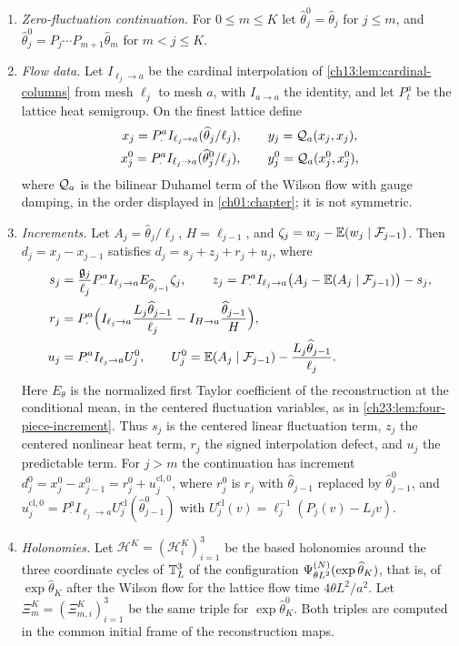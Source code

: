 \begin{definition}
\begin{enumerate}
\item \emph{Zero-fluctuation continuation.} For $0\le m\le K$ let $\widehat\theta_j^0=\widehat\theta_j$ for $j\le m$, and $\widehat\theta_j^0=P_j\cdots P_{m+1}\widehat\theta_m$ for $m<j\le K$.
\item \emph{Flow data.} Let $I_{\ell_j\to a}$ be the cardinal interpolation of \cref{ch13:lem:cardinal-columns} from mesh $\ell_j$ to mesh $a$, with $I_{a\to a}$ the identity, and let $P_t^a$ be the lattice heat semigroup. On the finest lattice define
\[
 \begin{gathered}
 x_j=P_\cdot^aI_{\ell_j\to a}(\widehat\theta_j/\ell_j),\qquad y_j=\mathcal Q_{a}(x_j,x_j),\\
 x_j^0=P_\cdot^aI_{\ell_j\to a}(\widehat\theta_j^0/\ell_j),\qquad y_j^0=\mathcal Q_{a}(x_j^0,x_j^0),
 \end{gathered}
\]
where $\mathcal Q_{a}$ is the bilinear Duhamel term of the Wilson flow with gauge damping, in the order displayed in \cref{ch01:chapter}; it is not symmetric.
\item \emph{Increments.} Let $A_j=\widehat\theta_j/\ell_j$, $H=\ell_{j-1}$, and $\zeta_j=w_j-\mathbb E(w_j\mid\mathcal F_{j-1})$. Then $d_j=x_j-x_{j-1}$ satisfies $d_j=s_j+z_j+r_j+u_j$, where
\begin{equation}\label{ch30:eq:increments}
\begin{split}
 s_j&=\frac{\mathfrak g_j}{\ell_j}P_\cdot^aI_{\ell_j\to a}E_{\widehat\theta_{j-1}}\zeta_j,\qquad
 z_j=P_\cdot^aI_{\ell_j\to a}\bigl(A_j-\mathbb E(A_j\mid\mathcal F_{j-1})\bigr)-s_j,\\
 r_j&=P_\cdot^a\Bigl(I_{\ell_j\to a}\frac{L_j\widehat\theta_{j-1}}{\ell_j}-I_{H\to a}\frac{\widehat\theta_{j-1}}{H}\Bigr),\\
 u_j&=P_\cdot^aI_{\ell_j\to a}U_j^0,\qquad U_j^0=\mathbb E(A_j\mid\mathcal F_{j-1})-\frac{L_j\widehat\theta_{j-1}}{\ell_j}.
\end{split}
\end{equation}
Here $E_\theta$ is the normalized first Taylor coefficient of the reconstruction at the conditional mean, in the centered fluctuation variables, as in \cref{ch23:lem:four-piece-increment}. Thus $s_j$ is the centered linear fluctuation term, $z_j$ the centered nonlinear heat term, $r_j$ the signed interpolation defect, and $u_j$ the predictable term. For $j>m$ the continuation has increment $d_j^0=x_j^0-x_{j-1}^0=r_j^0+u_j^{\mathrm{cl},0}$, where $r_j^0$ is $r_j$ with $\widehat\theta_{j-1}$ replaced by $\widehat\theta_{j-1}^0$, and $u_j^{\mathrm{cl},0}=P_\cdot^aI_{\ell_j\to a}U_j^{\mathrm{cl}}(\widehat\theta_{j-1}^0)$ with $U_j^{\mathrm{cl}}(v)=\ell_j^{-1}(P_j(v)-L_jv)$.
\item \emph{Holonomies.} Let $\mathcal H^K=(\mathcal H^K_i)_{i=1}^3$ be the based holonomies around the three coordinate cycles of $\mathbb T_L^3$ of the configuration $\Psi^{(N)}_{\theta L^2}(\exp\widehat\theta_K)$, that is, of $\exp\widehat\theta_K$ after the Wilson flow for the lattice flow time $4\theta L^2/a^2$. Let $\Xi_m^K=(\Xi^K_{m,i})_{i=1}^3$ be the same triple for $\exp\widehat\theta_K^0$. Both triples are computed in the common initial frame of the reconstruction maps.
\end{enumerate}
\end{definition}

